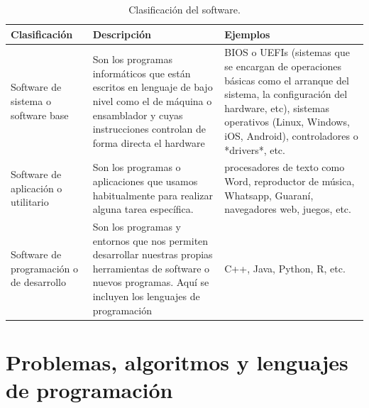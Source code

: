 \documentclass[
]{book}
\begin{document}
\begin{table}[H]
\caption{Clasificación del software.}
\begin{tabular}{ p{4cm} p{6cm} p{6cm}}
\toprule
Clasificación                            & Descripción                                                                                                                                                               & Ejemplos                                                                                                                                                                                                            \\ \midrule
Software de sistema o software base      & Son los programas informáticos que están escritos en lenguaje de bajo nivel como el de máquina o ensamblador y cuyas instrucciones controlan de forma directa el hardware & BIOS o UEFIs (sistemas que se encargan de operaciones básicas como el arranque del sistema, la configuración del hardware, etc), sistemas operativos (Linux, Windows, iOS, Android), controladores o *drivers*, etc. \\ \midrule
Software de aplicación o utilitario      & Son los programas o aplicaciones que usamos habitualmente para realizar alguna tarea específica.                                                                          & procesadores de texto como Word, reproductor de música, Whatsapp, Guaraní, navegadores web, juegos, etc.                                                                                                            \\ \midrule
Software de programación o de desarrollo & Son los programas y entornos que nos permiten desarrollar nuestras propias herramientas de software o nuevos programas. Aquí se incluyen los lenguajes de programación    & C++, Java, Python, R, etc.                                                                                                                                                                                          \\ \bottomrule
\end{tabular}
\end{table}

\hypertarget{problemas-algoritmos-y-lenguajes-de-programaciuxf3n}{%
\section{Problemas, algoritmos y lenguajes de programación}\label{problemas-algoritmos-y-lenguajes-de-programaciuxf3n}}
\end{document}

